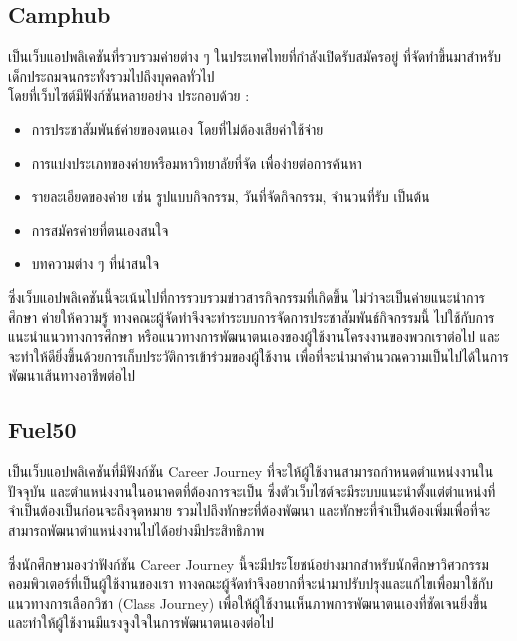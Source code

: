 \subsection{Camphub}
เป็นเว็บแอปพลิเคชันที่รวบรวมค่ายต่าง ๆ ในประเทศไทยที่กำลังเปิดรับสมัครอยู่ ที่จัดทำขึ้นมาสำหรับเด็กประถมจนกระทั่งรวมไปถึงบุคคลทั่วไป \\
โดยที่เว็บไซต์มีฟังก์ชันหลายอย่าง ประกอบด้วย :
\begin{itemize}
    \item การประชาสัมพันธ์ค่ายของตนเอง โดยที่ไม่ต้องเสียค่าใช้จ่าย
    \item การแบ่งประเภทของค่ายหรือมหาวิทยาลัยที่จัด เพื่อง่ายต่อการค้นหา
    \item รายละเอียดของค่าย เช่น รูปแบบกิจกรรม, วันที่จัดกิจกรรม, จำนวนที่รับ เป็นต้น
    \item การสมัครค่ายที่ตนเองสนใจ
    \item บทความต่าง ๆ ที่น่าสนใจ
\end{itemize}
\par ซึ่งเว็บแอปพลิเคชันนี้จะเน้นไปที่การรวบรวมข่าวสารกิจกรรมที่เกิดขึ้น ไม่ว่าจะเป็นค่ายแนะนำการศึกษา ค่ายให้ความรู้ ทางคณะผู้จัดทำจึงจะทำระบบการจัดการประชาสัมพันธ์กิจกรรมนี้ 
ไปใช้กับการแนะนำแนวทางการศึกษา หรือแนวทางการพัฒนาตนเองของผู้ใช้งานโครงงานของพวกเราต่อไป และจะทำให้ดียิ่งขึ้นด้วยการเก็บประวัติการเข้าร่วมของผู้ใช้งาน 
เพื่อที่จะนำมาคำนวณความเป็นไปได้ในการพัฒนาเส้นทางอาชีพต่อไป

\subsection{Fuel50}
เป็นเว็บแอปพลิเคชันที่มีฟังก์ชัน Career Journey ที่จะให้ผู้ใช้งานสามารถกำหนดตำแหน่งงานในปัจจุบัน และตำแหน่งงานในอนาคตที่ต้องการจะเป็น 
ซึ่งตัวเว็บไซต์จะมีระบบแนะนำตั้งแต่ตำแหน่งที่จำเป็นต้องเป็นก่อนจะถึงจุดหมาย รวมไปถึงทักษะที่ต้องพัฒนา 
และทักษะที่จำเป็นต้องเพิ่มเพื่อที่จะสามารถพัฒนาตำแหน่งงานไปได้อย่างมีประสิทธิภาพ
\par ซึ่งนักศึกษามองว่าฟังก์ชัน Career Journey นี้จะมีประโยชน์อย่างมากสำหรับนักศึกษาวิศวกรรมคอมพิวเตอร์ที่เป็นผู้ใช้งานของเรา 
ทางคณะผู้จัดทำจึงอยากที่จะนำมาปรับปรุงและแก้ไขเพื่อมาใช้กับแนวทางการเลือกวิชา (Class Journey) เพื่อให้ผู้ใช้งานเห็นภาพการพัฒนาตนเองที่ชัดเจนยิ่งขึ้น 
และทำให้ผู้ใช้งานมีแรงจูงใจในการพัฒนาตนเองต่อไป

